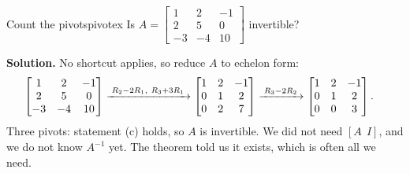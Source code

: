 \documentclass[11pt]{article}
\begin{document}
\begin{exmp}{Count the pivots}{pivotex}
Is $A=\begin{bmatrix}1&2&-1\\2&5&0\\-3&-4&10\end{bmatrix}$ invertible?

\textbf{Solution.} No shortcut applies, so reduce $A$ to echelon form:
\begin{align*}
\begin{bmatrix}1&2&-1\\2&5&0\\-3&-4&10\end{bmatrix}
&\xrightarrow{\;R_2-2R_1,\ R_3+3R_1\;}
\begin{bmatrix}1&2&-1\\0&1&2\\0&2&7\end{bmatrix}
\xrightarrow{\;R_3-2R_2\;}
\begin{bmatrix}1&2&-1\\0&1&2\\0&0&3\end{bmatrix}.
\end{align*}
Three pivots: statement (c) holds, so $A$ is invertible. We did not need $[A\ \ I]$, and we do not know $A^{-1}$ yet. The theorem told us it exists, which is often all we need.
\end{exmp}
\end{document}
